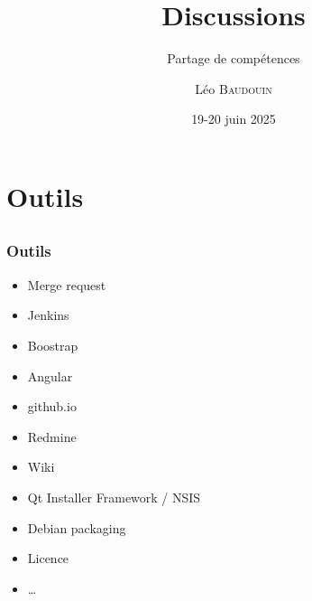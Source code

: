 \documentclass{beamer}
\title{Discussions}
\subtitle{Partage de compétences}
\author{L\'eo \textsc{Baudouin}}
\institute{
  {\url{baudouin.leo @ gmail.com}}
}
\date{19-20 juin 2025}
\begin{document}
\begin{frame}
  \titlepage
\end{frame}




\section{Outils}
\subsection{}

\begin{frame}
  \frametitle{Outils}
  \begin{block}{}
  \begin{itemize}[<+->]
  \item Merge request
  \item Jenkins
  \item Boostrap
  \item Angular
  \item github.io
  \item Redmine
  \item Wiki
  \item Qt Installer Framework / NSIS
  \item Debian packaging
  \item Licence
  \item \dots
  \end{itemize}
  \end{block}  
\end{frame}

\end{document}
